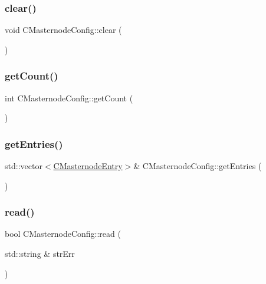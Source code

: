 \subsubsection{\texorpdfstring{clear()}{clear()}}
{\footnotesize\ttfamily void C\+Masternode\+Config\+::clear (\begin{DoxyParamCaption}{ }\end{DoxyParamCaption})}

\mbox{\label{class_c_masternode_config_ab67434f7d279d4837f4999f10265cd2f}} 
\subsubsection{\texorpdfstring{get\+Count()}{getCount()}}
{\footnotesize\ttfamily int C\+Masternode\+Config\+::get\+Count (\begin{DoxyParamCaption}{ }\end{DoxyParamCaption})\hspace{0.3cm}{\ttfamily [inline]}}

\mbox{\label{class_c_masternode_config_a21fb5f410e3dcd55429f256d4efe4e61}} 
\subsubsection{\texorpdfstring{get\+Entries()}{getEntries()}}
{\footnotesize\ttfamily std\+::vector$<$\mbox{\hyperlink{class_c_masternode_config_1_1_c_masternode_entry}{C\+Masternode\+Entry}}$>$\& C\+Masternode\+Config\+::get\+Entries (\begin{DoxyParamCaption}{ }\end{DoxyParamCaption})\hspace{0.3cm}{\ttfamily [inline]}}

\mbox{\label{class_c_masternode_config_a028d769bc39a23177cf81a3e433b6e86}} 
\subsubsection{\texorpdfstring{read()}{read()}}
{\footnotesize\ttfamily bool C\+Masternode\+Config\+::read (\begin{DoxyParamCaption}\item[{std\+::string \&}]{str\+Err }\end{DoxyParamCaption})}



